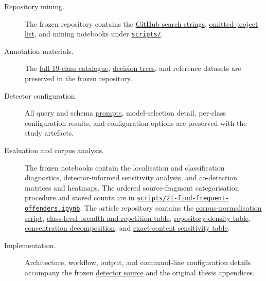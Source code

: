 \documentclass[a4paper,11pt]{article}
\begin{document}
\begin{description}
    \item[Repository mining.] The frozen repository contains the \href{https://github.com/kristoisberg/masters-thesis/blob/d9b35e398a6deb544f913bdbc0b211ab38474a44/thesis/appendices/appendix-github-search-terms.tex}{GitHub search strings}, \href{https://github.com/kristoisberg/masters-thesis/blob/d9b35e398a6deb544f913bdbc0b211ab38474a44/thesis/appendices/appendix-omitted-projects.tex}{omitted-project list}, and mining notebooks under \href{https://github.com/kristoisberg/masters-thesis/tree/d9b35e398a6deb544f913bdbc0b211ab38474a44/scripts}{\texttt{scripts/}}.
    \item[Annotation materials.] The \href{https://github.com/kristoisberg/masters-thesis/blob/d9b35e398a6deb544f913bdbc0b211ab38474a44/thesis/appendices/appendix-annotated-antipatterns.tex}{full 19-class catalogue}, \href{https://github.com/kristoisberg/masters-thesis/tree/d9b35e398a6deb544f913bdbc0b211ab38474a44/diagrams/decision}{decision trees}, and reference datasets are preserved in the frozen repository.
    \item[Detector configuration.] All query and schema \href{https://github.com/kristoisberg/masters-thesis/tree/d9b35e398a6deb544f913bdbc0b211ab38474a44/prompts}{prompts}, model-selection detail, per-class configuration results, and configuration options are preserved with the study artefacts.
    \item[Evaluation and corpus analysis.] The frozen notebooks contain the localisation and classification diagnostics, detector-informed sensitivity analysis, and co-detection matrices and heatmaps. The ordered source-fragment categorisation procedure and stored counts are in \href{https://github.com/kristoisberg/masters-thesis/blob/d9b35e398a6deb544f913bdbc0b211ab38474a44/scripts/21-find-frequent-offenders.ipynb}{\texttt{scripts/21-find-frequent-offenders.ipynb}}. The article repository contains the \href{https://github.com/kristoisberg/thesis-paper/blob/bb3bf6056cc7bbda29bb0fb5f0b720e7f9d06028/analysis/corpus_normalization.py}{corpus-normalisation script}, \href{https://github.com/kristoisberg/thesis-paper/blob/bb3bf6056cc7bbda29bb0fb5f0b720e7f9d06028/analysis/corpus_phase2_class_summary.csv}{class-level breadth and repetition table}, \href{https://github.com/kristoisberg/thesis-paper/blob/bb3bf6056cc7bbda29bb0fb5f0b720e7f9d06028/analysis/corpus_phase3_density_summary.csv}{repository-density table}, \href{https://github.com/kristoisberg/thesis-paper/blob/bb3bf6056cc7bbda29bb0fb5f0b720e7f9d06028/analysis/corpus_phase3_concentration.csv}{concentration decomposition}, and \href{https://github.com/kristoisberg/thesis-paper/blob/bb3bf6056cc7bbda29bb0fb5f0b720e7f9d06028/analysis/corpus_phase4_exact_duplicate_sensitivity.csv}{exact-content sensitivity table}.
    \item[Implementation.] Architecture, workflow, output, and command-line configuration details accompany the frozen \href{https://github.com/kristoisberg/jooq-antipattern-detector/tree/cf82fe56acb728f076df67279ff4a78a138996f3}{detector source} and the original thesis appendices.
\end{description}
\end{document}
